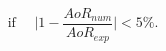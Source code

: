 \begin{equation}
\text{if} ~~~~~~ \lvert{1-\frac{AoR_{num}}{AoR_{exp}}}\rvert < 5\% .
\label{eq:checkaor}
\end{equation}
